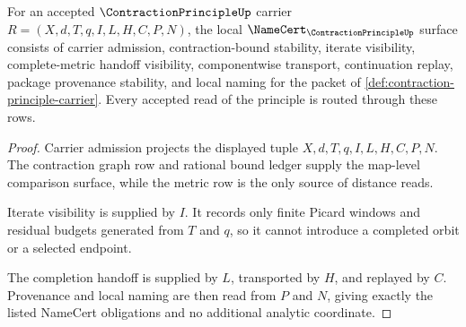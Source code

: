 \begin{theorem}
\label{thm:contraction-principle-namecert-obligations}
For an accepted $\ContractionPrincipleUp$ carrier $R=(X,d,T,q,I,L,H,C,P,N)$, the local $\NameCert_{\ContractionPrincipleUp}$ surface consists of carrier admission, contraction-bound stability, iterate visibility, complete-metric handoff visibility, componentwise transport, continuation replay, package provenance stability, and local naming for the packet of \autoref{def:contraction-principle-carrier}. Every accepted read of the principle is routed through these rows.
\end{theorem}
\begin{proof}
Carrier admission projects the displayed tuple $X,d,T,q,I,L,H,C,P,N$. The contraction graph row and rational bound ledger supply the map-level comparison surface, while the metric row is the only source of distance reads.

Iterate visibility is supplied by $I$. It records only finite Picard windows and residual budgets generated from $T$ and $q$, so it cannot introduce a completed orbit or a selected endpoint.

The completion handoff is supplied by $L$, transported by $H$, and replayed by $C$. Provenance and local naming are then read from $P$ and $N$, giving exactly the listed NameCert obligations and no additional analytic coordinate.
\end{proof}

